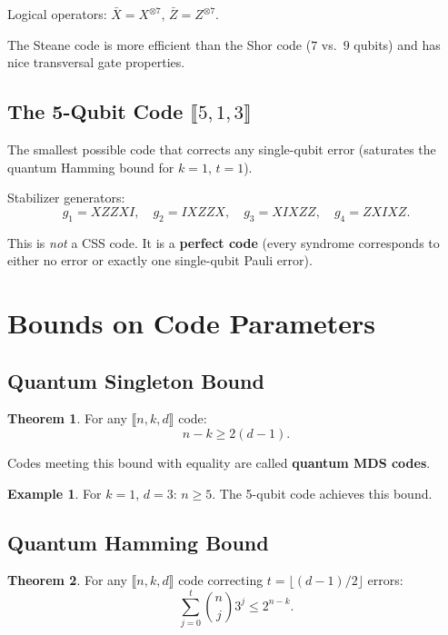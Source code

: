 \documentclass[11pt]{article}
\theoremstyle{definition}
\newtheorem{example}{Example}[section]
\newtheorem{theorem}{Theorem}[section]
\begin{document}
Logical operators: $\bar{X}=X^{\otimes 7}$, $\bar{Z}=Z^{\otimes 7}$.

The Steane code is more efficient than the Shor code ($7$ vs.\ $9$ qubits) and has nice transversal gate properties.

\subsection{The 5-Qubit Code $\llbracket 5,1,3\rrbracket$}

The smallest possible code that corrects any single-qubit error (saturates the quantum Hamming bound for $k=1$, $t=1$).

Stabilizer generators:
\[
    g_1=XZZXI,\quad g_2=IXZZX,\quad g_3=XIXZZ,\quad g_4=ZXIXZ.
\]

This is \emph{not} a CSS code.  It is a \textbf{perfect code} (every syndrome corresponds to either no error or exactly one single-qubit Pauli error).

\section{Bounds on Code Parameters}

\subsection{Quantum Singleton Bound}

\begin{theorem}
For any $\llbracket n,k,d\rrbracket$ code:
\[
    n - k \ge 2(d-1).
\]
\end{theorem}

Codes meeting this bound with equality are called \textbf{quantum MDS codes}.

\begin{example}
For $k=1$, $d=3$: $n\ge 5$.  The 5-qubit code achieves this bound.
\end{example}

\subsection{Quantum Hamming Bound}

\begin{theorem}
For any $\llbracket n,k,d\rrbracket$ code correcting $t=\lfloor(d-1)/2\rfloor$ errors:
\[
    \sum_{j=0}^{t}\binom{n}{j}3^j \le 2^{n-k}.
\]
\end{theorem}
\end{document}
